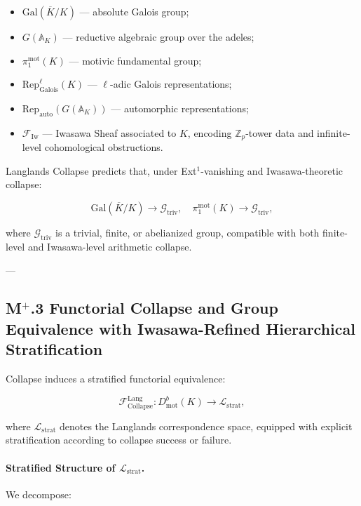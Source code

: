 \documentclass[11pt]{article}
\begin{document}
\begin{itemize}
    \item $\mathrm{Gal}(\overline{K}/K)$ — absolute Galois group;
    \item $G(\mathbb{A}_K)$ — reductive algebraic group over the adeles;
    \item $\pi_1^{\mathrm{mot}}(K)$ — motivic fundamental group;
    \item $\mathrm{Rep}_{\mathrm{Galois}}^\ell(K)$ — $\ell$-adic Galois representations;
    \item $\mathrm{Rep}_{\mathrm{auto}}(G(\mathbb{A}_K))$ — automorphic representations;
    \item $\mathcal{F}_{\mathrm{Iw}}$ — Iwasawa Sheaf associated to $K$, encoding $\mathbb{Z}_p$-tower data and infinite-level cohomological obstructions.
\end{itemize}

Langlands Collapse predicts that, under Ext$^1$-vanishing and Iwasawa-theoretic collapse:

\[
\mathrm{Gal}(\overline{K}/K) \longrightarrow \mathcal{G}_{\mathrm{triv}}, \quad \pi_1^{\mathrm{mot}}(K) \longrightarrow \mathcal{G}_{\mathrm{triv}},
\]

where $\mathcal{G}_{\mathrm{triv}}$ is a trivial, finite, or abelianized group, compatible with both finite-level and Iwasawa-level arithmetic collapse.

---

\subsection*{M$^{+}$.3 Functorial Collapse and Group Equivalence with Iwasawa-Refined Hierarchical Stratification}

Collapse induces a stratified functorial equivalence:

\[
\mathcal{F}_{\mathrm{Collapse}}^{\mathrm{Lang}} : D^b_{\mathrm{mot}}(K) \longrightarrow \mathcal{L}_{\mathrm{strat}},
\]

where \( \mathcal{L}_{\mathrm{strat}} \) denotes the Langlands correspondence space, equipped with explicit stratification according to collapse success or failure.

\paragraph{Stratified Structure of \( \mathcal{L}_{\mathrm{strat}} \).}

We decompose:
\end{document}
